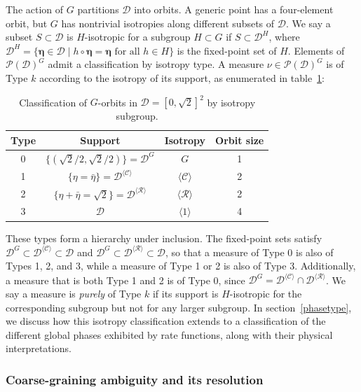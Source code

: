 \documentclass[a4paper,11pt]{article}
\theoremstyle{plain}
\theoremstyle{definition}
\theoremstyle{remark}
\newcommand{\bs}[1]{\boldsymbol{#1}}
\begin{document}
The action of $G$ partitions $\mathcal{D}$ into orbits. A generic point has a four-element orbit, but $G$ has nontrivial isotropies along different subsets of $\mathcal{D}$. We say a subset $S \subset \mathcal{D}$ is $H$-isotropic for a subgroup $H \subset G$ if $S \subset \mathcal{D}^H$, where $\mathcal{D}^H = \{\bs{\eta} \in \mathcal{D} \mid h \circ \bs{\eta} = \bs{\eta} \text{ for all } h \in H\}$ is the fixed-point set of $H$. Elements of $\mathcal{P}(\mathcal{D})^G$ admit a classification by isotropy type. A measure $\nu \in \mathcal{P}(\mathcal{D})^G$ is of Type $k$ according to the isotropy of its support, as enumerated in table~\ref{tab:orbits}:
\begin{table}[h]
\centering
\begin{tabular}{c|c|c|c}
Type & Support & Isotropy & Orbit size \\
\hline
0 & $\{(\sqrt{2}/2, \sqrt{2}/2)\} = \mathcal{D}^G$ & $G$ & 1 \\
1 & $\{\eta = \bar{\eta}\} = \mathcal{D}^{\langle\mathcal{C} \rangle}$ & $\langle \mathcal{C} \rangle$ & 2 \\
2 & $\{\eta+ \bar{\eta} = \sqrt{2}\} =\mathcal{D}^{\langle\mathcal{R} \rangle} $ & $\langle \mathcal{R} \rangle$ & 2 \\
3 & $\mathcal{D}$ & $\langle 1\rangle$ & 4 \\
\end{tabular}
\caption{Classification of $G$-orbits in $\mathcal{D} = [0,\sqrt{2}]^2$ by isotropy subgroup.}
\label{tab:orbits}
\end{table}
These types form a hierarchy under inclusion. The fixed-point sets satisfy $\mathcal{D}^G \subset \mathcal{D}^{\langle \mathcal{C} \rangle}\subset \mathcal{D}$ and $\mathcal{D}^G \subset \mathcal{D}^{\langle \mathcal{R} \rangle} \subset \mathcal{D}$, so that a measure of Type 0 is also of Types 1, 2, and 3, while a measure of Type 1 or 2 is also of Type 3. Additionally, a measure that is both Type 1 and 2 is of Type 0, since $\mathcal{D}^G = \mathcal{D}^{\langle\mathcal{C}\rangle} \cap\mathcal{D}^{\langle\mathcal{\mathcal{R}}\rangle}$. We say a measure is \emph{purely} of Type $k$ if its support is $H$-isotropic for the corresponding subgroup but not for any larger subgroup. In section~\ref{phasetype}, we discuss how this isotropy classification extends to a classification of the different global phases exhibited by rate functions, along with their physical interpretations.

\subsubsection{Coarse-graining ambiguity and its resolution}
\end{document}
